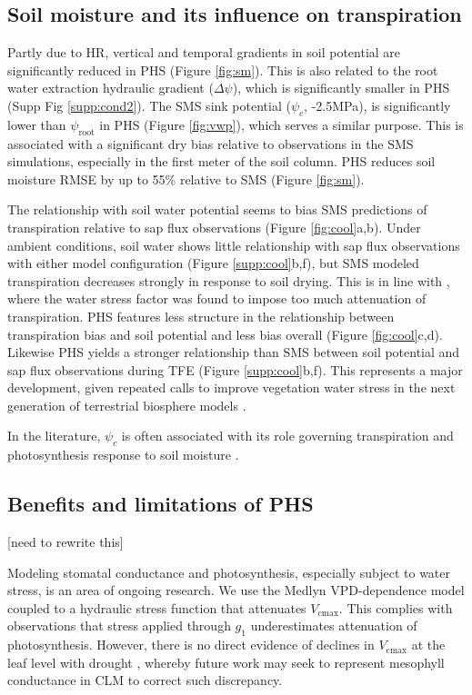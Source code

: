\documentclass[draft,linenumbers]{agujournal}
\begin{document}
\subsection{Soil moisture and its influence on transpiration}

    Partly due to HR, vertical and temporal gradients in soil potential are significantly reduced in PHS (Figure \ref{fig:sm}).
    This is also related to the root water extraction hydraulic gradient ($\Delta\psi$), which is significantly smaller in PHS (Supp Fig \ref{supp:cond2}).
    The SMS sink potential ($\psi_c$, -2.5MPa), is significantly lower than $\psi_{\text{root}}$ in PHS (Figure \ref{fig:vwp}), which serves a similar purpose.
    This is associated with a significant dry bias relative to observations in the SMS simulations, especially in the first meter of the soil column.
    PHS reduces soil moisture RMSE by up to 55\% relative to SMS (Figure \ref{fig:sm}).
    
    The relationship with soil water potential seems to bias SMS predictions of transpiration relative to sap flux observations (Figure \ref{fig:cool}a,b).
    Under ambient conditions, soil water shows little relationship with sap flux observations with either model configuration (Figure \ref{supp:cool}b,f), 
    but SMS modeled transpiration decreases strongly in response to soil drying.
    This is in line with \cite{bonan2014}, where the water stress factor was found to impose too much attenuation of transpiration.
    PHS features less structure in the relationship between transpiration bias and soil potential and less bias overall (Figure \ref{fig:cool}c,d).
    Likewise PHS yields a stronger relationship than SMS between soil potential and sap flux observations during TFE (Figure \ref{supp:cool}b,f).
    This represents a major development, given repeated calls to improve vegetation water stress in the next generation of terrestrial biosphere models \citep{powell2013,rogers2017}.

    In the literature, $\psi_c$ is often associated with its role governing transpiration and photosynthesis response to soil moisture \citep{powell2013,bonan2014,rogers2017}.


\subsection{Benefits and limitations of PHS}

[need to rewrite this]

Modeling stomatal conductance and photosynthesis, especially subject to water stress, is an area of ongoing research. We use the Medlyn VPD-dependence model coupled to a hydraulic stress function that attenuates $V_{\text{cmax}}$. This complies with observations \citep{lin2018,zhou2013} that stress applied through $g_1$ underestimates attenuation of photosynthesis. However, there is no direct evidence of declines in $V_{\text{cmax}}$ at the leaf level with drought \citep{flexas2006}, whereby future work may seek to represent mesophyll conductance in CLM to correct such discrepancy.
    
\end{document}
